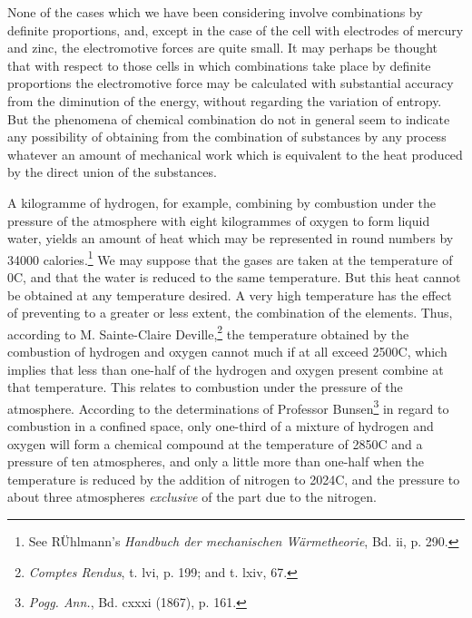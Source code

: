 \documentclass[12pt]{memoir}
\begin{document}
None of the cases which we have been considering involve combinations by definite proportions, and, except in the case of the cell with electrodes of mercury and zinc, the electromotive forces are quite small. It may perhaps be thought that with respect to those cells in which combinations take place by definite proportions the electromotive force may be calculated with substantial accuracy from the diminution of the energy, without regarding the variation of entropy. But the phenomena of chemical combination do not in general seem to indicate any possibility of obtaining from the combination of substances by any process whatever an amount of mechanical work which is equivalent to the heat produced by the direct union of the substances.

A kilogramme of hydrogen, for example, combining by combustion under the pressure of the atmosphere with eight kilogrammes of oxygen to form liquid water, yields an amount of heat which may be represented in round numbers by 34000 calories.\footnote{See R\"{U}hlmann's \textit{Handbuch der mechanischen W\"{a}rmetheorie}, Bd. ii, p. 290.} We may suppose that the gases are taken at the temperature of 0\degree C, and that the water is reduced to the same temperature. But this heat cannot be obtained at any temperature desired. A very high temperature has the effect of preventing to a greater or less extent, the combination of the elements. Thus, according to M. Sainte-Claire Deville,\footnote{\textit{Comptes Rendus}, t. lvi, p. 199; and t. lxiv, 67.} the temperature obtained by the combustion of hydrogen and oxygen cannot much if at all exceed 2500\degree C, which implies that less than one-half of the hydrogen and oxygen present combine at that temperature. This relates to combustion under the pressure of the atmosphere. According to the determinations of Professor Bunsen\footnote{\textit{Pogg. Ann.}, Bd. cxxxi (1867), p. 161.} in regard to combustion in a confined space, only one-third of a mixture of hydrogen and oxygen will form a chemical compound at the temperature of 2850\degree C and a pressure of ten atmospheres, and only a little more than one-half when the temperature is reduced by the addition of nitrogen to 2024\degree C, and the pressure to about three atmospheres \textit{exclusive} of the part due to the nitrogen.
\end{document}
